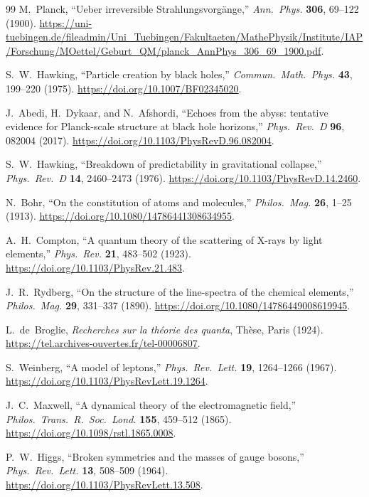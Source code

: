 \documentclass[a4paper]{article}
\begin{document}
\begin{thebibliography}{99}
M.~Planck,
``Ueber irreversible Strahlungsvorg\"ange,''
\textit{Ann.\ Phys.} \textbf{306}, 69--122 (1900).
\url{https://uni-tuebingen.de/fileadmin/Uni_Tuebingen/Fakultaeten/MathePhysik/Institute/IAP/Forschung/MOettel/Geburt_QM/planck_AnnPhys_306_69_1900.pdf}.

S.~W.~Hawking,
``Particle creation by black holes,''
\textit{Commun.\ Math.\ Phys.} \textbf{43}, 199--220 (1975).
\url{https://doi.org/10.1007/BF02345020}.

J.~Abedi, H.~Dykaar, and N.~Afshordi,
``Echoes from the abyss: tentative evidence for Planck-scale structure at black hole horizons,''
\textit{Phys.\ Rev.\ D} \textbf{96}, 082004 (2017).
\url{https://doi.org/10.1103/PhysRevD.96.082004}.

S.~W.~Hawking,
``Breakdown of predictability in gravitational collapse,''
\textit{Phys.\ Rev.\ D} \textbf{14}, 2460--2473 (1976).
\url{https://doi.org/10.1103/PhysRevD.14.2460}.

N.~Bohr,
``On the constitution of atoms and molecules,''
\textit{Philos.\ Mag.} \textbf{26}, 1--25 (1913).
\url{https://doi.org/10.1080/14786441308634955}.

A.~H.~Compton,
``A quantum theory of the scattering of X-rays by light elements,''
\textit{Phys.\ Rev.} \textbf{21}, 483--502 (1923).
\url{https://doi.org/10.1103/PhysRev.21.483}.

J.~R.~Rydberg,
``On the structure of the line-spectra of the chemical elements,''
\textit{Philos.\ Mag.} \textbf{29}, 331--337 (1890).
\url{https://doi.org/10.1080/14786449008619945}.

L.~de~Broglie,
\textit{Recherches sur la th\'eorie des quanta},
Th\`ese, Paris (1924).
\url{https://tel.archives-ouvertes.fr/tel-00006807}.

S.~Weinberg,
``A model of leptons,''
\textit{Phys.\ Rev.\ Lett.} \textbf{19}, 1264--1266 (1967).
\url{https://doi.org/10.1103/PhysRevLett.19.1264}.

J.~C.~Maxwell,
``A dynamical theory of the electromagnetic field,''
\textit{Philos.\ Trans.\ R.\ Soc.\ Lond.} \textbf{155}, 459--512 (1865).
\url{https://doi.org/10.1098/rstl.1865.0008}.

P.~W.~Higgs,
``Broken symmetries and the masses of gauge bosons,''
\textit{Phys.\ Rev.\ Lett.} \textbf{13}, 508--509 (1964).
\url{https://doi.org/10.1103/PhysRevLett.13.508}.


\end{thebibliography}
\end{document}
